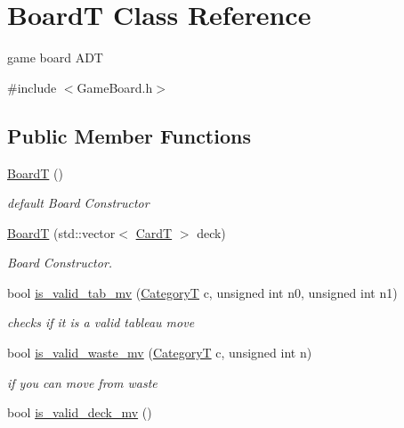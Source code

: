 \hypertarget{class_board_t}{}\section{BoardT Class Reference}
\label{class_board_t}


game board A\+DT  




{\ttfamily \#include $<$Game\+Board.\+h$>$}

\subsection*{Public Member Functions}
\begin{DoxyCompactItemize}
\item 
\mbox{\label{class_board_t_aa04ccc9d22e66b83d91853f1a9082221}} 
\hyperlink{class_board_t_aa04ccc9d22e66b83d91853f1a9082221}{BoardT} ()
\begin{DoxyCompactList}\small\item\em default Board Constructor \end{DoxyCompactList}\item 
\hyperlink{class_board_t_a4a25fcb5e2e968e11d50bf6c1bb763a1}{BoardT} (std\+::vector$<$ \hyperlink{struct_card_t}{CardT} $>$ deck)
\begin{DoxyCompactList}\small\item\em Board Constructor. \end{DoxyCompactList}\item 
bool \hyperlink{class_board_t_a5040686ca35f4082489878bdb1d5a7f2}{is\+\_\+valid\+\_\+tab\+\_\+mv} (\hyperlink{_card_types_8h_aa77f81f8d4c8aa57046a50ca32d6b7b4}{CategoryT} c, unsigned int n0, unsigned int n1)
\begin{DoxyCompactList}\small\item\em checks if it is a valid tableau move \end{DoxyCompactList}\item 
bool \hyperlink{class_board_t_a82db88cb56e46b58d46a16fa201bb545}{is\+\_\+valid\+\_\+waste\+\_\+mv} (\hyperlink{_card_types_8h_aa77f81f8d4c8aa57046a50ca32d6b7b4}{CategoryT} c, unsigned int n)
\begin{DoxyCompactList}\small\item\em if you can move from waste \end{DoxyCompactList}\item 
bool \hyperlink{class_board_t_affe6cfc5c246bcfa0afd59476c70db8c}{is\+\_\+valid\+\_\+deck\+\_\+mv} ()

\end{DoxyCompactItemize}
